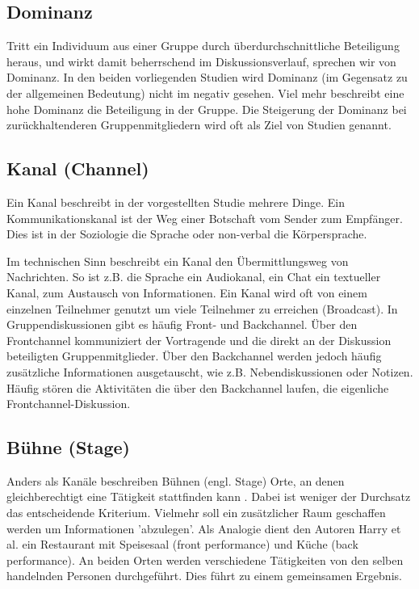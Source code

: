 \documentclass{seminarvorlage}
\begin{document}
\subsection{Dominanz}
Tritt ein Individuum aus einer Gruppe durch üb\-er\-durch\-schnitt\-liche
Beteiligung heraus, und wirkt damit beherrschend im Diskussionsverlauf, sprechen
wir von Dominanz.
In den beiden vorliegenden Studien \cite{HarGorSch2012} \cite{KimChaHolPent2008}
wird Dominanz (im Gegensatz zu der allgemeinen Bedeutung) nicht im negativ
gesehen. Viel mehr beschreibt eine hohe Dominanz die Beteiligung in der Gruppe.
Die Steigerung der Dominanz bei zurückhaltenderen Gruppenmitgliedern wird oft
als Ziel von Studien genannt.

\subsection{Kanal (Channel)}
Ein Kanal beschreibt in der vorgestellten Studie \cite{BergKara2009-1} mehrere Dinge.
Ein Kommunikationskanal ist der Weg einer Botschaft vom Sender zum
Empfänger. Dies ist in der Soziologie die Sprache oder non-verbal die
Kör\-per\-spra\-che.

Im technischen Sinn beschreibt ein Kanal den Über\-mitt\-lungs\-weg von
Nachrichten.
So ist z.B. die Sprache ein Audiokanal, ein Chat ein textueller Kanal,
zum Austausch von Informationen. Ein Kanal wird oft von einem einzelnen
Teilnehmer genutzt um viele Teilnehmer zu erreichen (Broadcast).
In Gruppendiskussionen gibt es häufig Front- und Backchannel. Über den
Frontchannel kommuniziert der Vortragende und die direkt an der Diskussion
beteiligten Gruppenmitglieder. Über den Backchannel werden jedoch häufig
zusätzliche Informationen ausgetauscht, wie z.B. Nebendiskussionen oder Notizen.
Häufig stören die Aktivitäten die über den Backchannel laufen, die eigenliche
Frontchannel-Diskussion.

\subsection{Bühne (Stage)}
Anders als Kanäle beschreiben Bühnen (engl. Stage) Orte, an denen
gleichberechtigt eine Tätigkeit stattfinden kann \cite{Goff1959}. Dabei ist
weniger der Durchsatz das entscheidende Kriterium. Vielmehr soll ein
zusätzlicher Raum geschaffen werden um Informationen 'abzulegen'. Als Analogie dient den
Autoren Harry et al. \cite{HarGorSch2012} ein Restaurant mit Speisesaal (front performance) und Küche
(back performance).
An beiden Orten werden verschiedene Tätigkeiten von den selben handelnden
Personen durchgeführt. Dies führt zu einem gemeinsamen Ergebnis.
\end{document}
